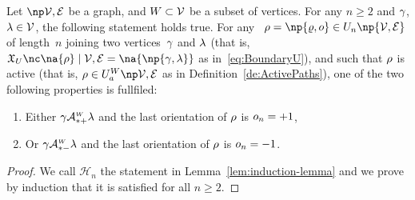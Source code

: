 \documentclass[12pt]{article}
\begin{document}
{{{\begin{lemma}
  Let \( \npOrientedGraph \) be a graph, 
  and $W\subset{\cal V}$ be a subset of vertices.
  For any $n\ge 2$ and $\gamma$, $\lambda \in {\cal V}$, the following statement
  holds true.
  For any
  \undirectedEdgePath\ \( \UndirectedPath = \np{\path,\orient} \in \UPATH_{n}\np{\graph} \) of length~$n$
  joining two vertices~$\gamma$ and $\lambda$ (that is,
  \( \BoundaryU{\na{\UndirectedPath}}{\graph}=\na{ \np{\bgent,\cgent} } \) as in~\eqref{eq:BoundaryU}), and
  such that \( \rho \) is active (that is,
  \( \UndirectedPath \in \ActiveUndirectedPaths{\graph} \) as in
  Definition~\ref{de:ActivePaths}), 
  one of the two following properties is fullfiled:
  \begin{enumerate}
  \item
    Either $\gamma\mathcal{A}^{\text{\tiny $W$}}_{*+} \lambda$ and
    the last orientation of $\rho$ is $o_n=+1$,
    \label{it:lem:induction-lemma_+1}
  \item
    Or $\gamma\mathcal{A}^{\text{\tiny $W$}}_{*-} \lambda$ and
    the last orientation of $\rho$ is $o_n=-1$.
    \label{it:lem:induction-lemma_-1}
  \end{enumerate}
  \label{lem:induction-lemma}
\end{lemma}


\begin{proof}
  We call ${\mathcal H}_{n}$ the statement in Lemma~\ref{lem:induction-lemma}
  and we prove by induction that it is satisfied for all $n\ge 2$.
  \medskip


\end{proof}}}}
\end{document}
